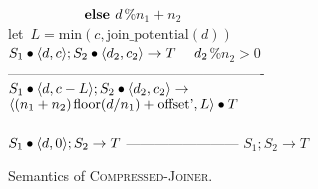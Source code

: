 \begin{figure}
$\mbox{~~~~}\hspace{37.7pt}\mbox{\bf ~else~} d$\%$n_1 + n_2$\\
let~$L=\mbox{min}(c,\mbox{join\_potential}(d))$\\
$S_1 \bullet \langle d, c\rangle; S_2 \bullet \langle d_2, c_2\rangle \rightarrow T~~~~d_2$\%$n_2 > 0$\vspace{-3pt}\skiptopa
-------------------------------------------------------\skipbot
$S_1 \bullet \langle d, c-L\rangle; S_2 \bullet \langle d_2, c_2\rangle \rightarrow$\\
$\langle(n_1 + n_2){\hspace{1.3pt}}\mbox{floor}(d/n_1) + \mbox{offset'}, L\rangle \bullet T$
\\ ~ \\
$S_1 \bullet \langle d, 0\rangle; S_2 \rightarrow T$\skiptopb
------------------------\skipbot
$S_1; S_2 \rightarrow T$
\caption{Semantics of \textsc{Compressed-Joiner}.
\protect\label{fig:compressed-joiner}}
\end{figure}

